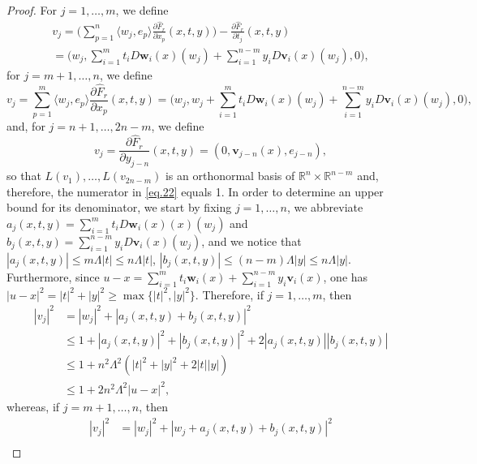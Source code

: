 \documentclass[JEP,XML,SOM,Unicode,ThmDefs,NoEqCountersInSection]{cedram}
\newcommand{\R}{\mathbb{R}}
\newcommand{\Rn}{\R^n}
\newcommand{\bv}{{\boldsymbol{v}}}
\newcommand{\bw}{{\boldsymbol{w}}}
\let\la\langle
\let\ra\rangle
\begin{document}
\begin{proof}
For $j=1,\ldots,m$, we define\vspace*{-3pt}
\begin{multline*}
v_j = \biggl(\sum_{p=1}^n \la w_j, e_p \ra \frac{\partial \hat{F}_r}{\partial x_p}(x,t,y)\biggr) - \frac{\partial \hat{F}_r}{\partial t_j}(x,t,y)
\\[-5pt]
= \biggl(w_j, \sum_{i=1}^m t_i D\bw_i(x)(w_j) + \sum_{i=1}^{n-m} y_i D\bv_i(x)(w_j), 0 \biggr),
\end{multline*}
for $j=m+1,\ldots,n$, we define
\begin{equation*}
v_j = \sum_{p=1}^m \la w_j, e_p \ra \frac{\partial \hat{F}_r}{\partial x_p}(x,t,y)
= \biggl(w_j, w_j + \sum_{i=1}^m t_i D\bw_i(x)(w_j) + \sum_{i=1}^{n-m} y_i D\bv_i(x)(w_j), 0 \biggr),
\end{equation*}
and, for $j=n+1,\ldots,2n-m$, we define\vspace*{-3pt}
\begin{equation*}
v_j = \frac{\partial \hat{F}_r}{\partial y_{j-n}}(x,t,y) = (0, \bv_{j-n}(x),e_{j-n}),
\end{equation*}
so that $L(v_1),\ldots,L(v_{2n-m})$ is an orthonormal basis of $\Rn \times \R^{n-m}$ and, therefore, the numerator in \eqref{eq.22} equals 1.
In order to determine an upper bound for its denominator, we start by fixing $j=1,\ldots,n$, we abbreviate $a_j(x,t,y) = \sum_{i=1}^m t_i D\bw_i(x)(x)(w_j)$ and $b_j(x,t,y) = \sum_{i=1}^{n-m} y_i D\bv_i(x)(w_j)$, and we notice that $|a_j(x,t,y)| \leq m \Lambda |t| \leq n \Lambda |t|$, $|b_j(x,t,y)| \leq (n-m) \Lambda |y| \leq n \Lambda |y|$.
Furthermore, since $u - x = \sum_{i=1}^m t_i \bw_i(x) + \sum_{i=1}^{n-m} y_i \bv_i(x)$, one has $|u-x|^2 = |t|^2 + |y|^2 \geq \max \{|t|^2,|y|^2\}$.
Therefore, if $j=1,\ldots,m$, then
\begin{equation*}
\begin{split}
|v_j|^2 & = |w_j|^2 + \left| a_j(x,t,y) + b_j(x,t,y) \right|^2 \\
& \leq 1 + \left|a_j(x,t,y)\right|^2 + \left|b_j(x,t,y)\right|^2 + 2 \left|a_j(x,t,y)\right| \left|b_j(x,t,y)\right| \\
& \leq 1 + n^2 \Lambda^2 \left(|t|^2 + |y|^2 + 2 |t| |y|\right) \\
& \leq 1 + 2 n^2 \Lambda^2 |u-x|^2,
\end{split}
\end{equation*}
whereas, if $j=m+1,\ldots,n$, then
\begin{equation*}
\begin{split}
\left| v_j\right|^2 &= |w_j|^2 + |w_j + a_j(x,t,y) + b_j(x,t,y)|^2 \\

\end{split}
\end{equation*}
\end{proof}
\end{document}
